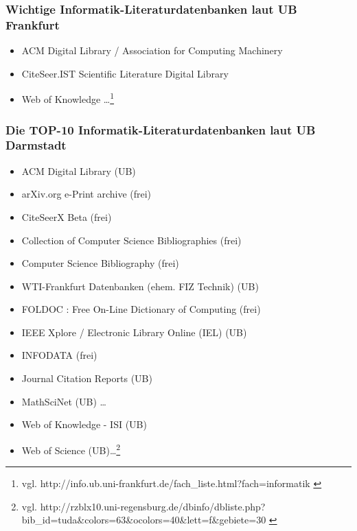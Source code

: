 \documentclass[DIV=calc,BCOR=5mm,11pt,headings=small,oneside,abstract=false, toc=bib]{scrartcl}
\begin{document}
\subsubsection{Wichtige Informatik-Literaturdatenbanken laut UB Frankfurt}

\begin{itemize}
  \item ACM Digital Library / Association for Computing Machinery
  \item CiteSeer.IST Scientific Literature Digital Library
  \item Web of Knowledge \ldots\footnote{ \tiny vgl. {\ttfamily
  http://info.ub.uni-frankfurt.de/fach\_liste.html?fach=informatik }}
\end{itemize}

\subsubsection{Die TOP-10 Informatik-Literaturdatenbanken laut UB Darmstadt}

\begin{itemize}
  \item ACM Digital Library (UB)
  \item arXiv.org e-Print archive (frei)
  \item CiteSeerX Beta 	(frei)
  \item Collection of Computer Science Bibliographies (frei)
  \item Computer Science Bibliography (frei)
  \item WTI-Frankfurt Datenbanken (ehem. FIZ Technik) (UB)
  \item FOLDOC : Free On-Line Dictionary of Computing (frei)
  \item IEEE Xplore / Electronic Library Online (IEL) (UB)
  \item INFODATA (frei)
  \item Journal Citation Reports (UB)
  \item MathSciNet (UB) \ldots
  \item Web of Knowledge - ISI 	(UB)
  \item Web of Science (UB)\ldots\footnote{{\tiny vgl. {\ttfamily 
http://rzblx10.uni-regensburg.de/dbinfo/dbliste.php?bib\_id=tuda\&colors=63\&ocolors=40\&lett=f\&gebiete=30
}}}
\end{itemize}
\end{document}
